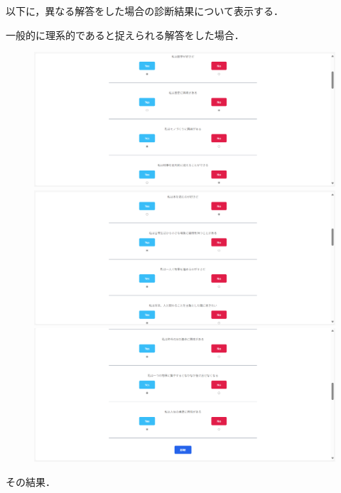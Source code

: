 \documentclass[a4j, titlepage]{jarticle}
\begin{document}
以下に，異なる解答をした場合の診断結果について表示する．

一般的に理系的であると捉えられる解答をした場合．

\begin{figure}[htbp]
  \centering
\includegraphics[scale=0.12]{dousakekka-4.png}
\includegraphics[scale=0.12]{dousakekka-5.png}
\includegraphics[scale=0.12]{dousakekka-6.png}
\end{figure}

その結果．
\end{document}
